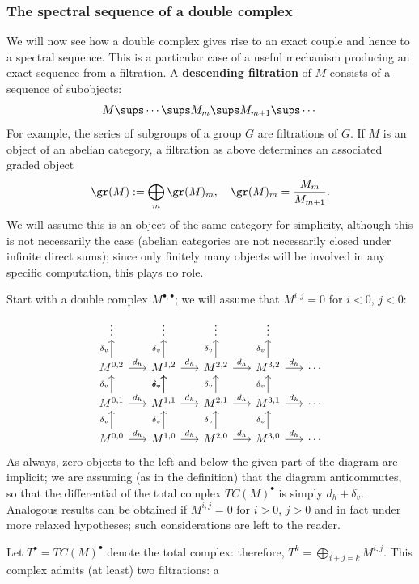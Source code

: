 \subsubsection{The spectral sequence of a double complex}
We will now see how a double complex gives rise to an exact couple and hence to a spectral sequence. This is a particular case of a useful mechanism producing an exact sequence from a filtration. A \textbf{descending filtration} of $M$ consists of a sequence of subobjects:
\[M\sups\cdots\sups M_m\sups M_{m+1}\sups\cdots\]
For example, the series of subgroups of a group $G$ are filtrations of $G$. If $M$ is an object of an abelian category, a filtration as above determines an associated graded object
\[\gr(M):=\bigoplus_m\gr(M)_m,\quad \gr(M)_m=\dfrac{M_m}{M_{m+1}}.\]
We will assume this is an object of the same category for simplicity, although this is not necessarily the case (abelian categories are not necessarily closed under
infinite direct sums); since only finitely many objects will be involved in any specific computation, this plays no role.\par
Start with a double complex $M^{\bullet,\bullet}$; we will assume that $M^{i,j}=0$ for $i<0$, $j<0$:
\[\begin{tikzcd}[column sep=1.6 em,row sep=1.6 em]
\vdots&\vdots&\vdots&\vdots&{}\\
M^{0,2}\ar[u,"\delta_v"]\ar[r,"d_h"]&M^{1,2}\ar[u,"\delta_v"]\ar[r,"d_h"]&M^{2,2}\ar[u,"\delta_v"]\ar[r,"d_h"]&M^{3,2}\ar[r,"d_h"]\ar[u,"\delta_v"]&\cdots\\
M^{0,1}\ar[r,"d_h"]\ar[u,"\delta_v"]&M^{1,1}\ar[u,"\delta_v"]\ar[r,"d_h"]\ar[u,"\delta_v"]&M^{2,1}\ar[u,"\delta_v"]\ar[r,"d_h"]&M^{3,1}\ar[u,"\delta_v"]\ar[r,"d_h"]&\cdots\\
M^{0,0}\ar[u,"\delta_v"]\ar[r,"d_h"]&M^{1,0}\ar[u,"\delta_v"]\ar[r,"d_h"]&M^{2,0}\ar[u,"\delta_v"]\ar[r,"d_h"]&M^{3,0}\ar[r,"d_h"]\ar[u,"\delta_v"]&\cdots
\end{tikzcd}\]
As always, zero-objects to the left and below the given part of the diagram are implicit; we are assuming (as in the definition) that the diagram anticommutes, so that 
the differential of the total complex $TC(M)^\bullet$ is simply $d_h+\delta_v$. Analogous results can be obtained if $M^{i,j}=0$ for $i>0$, $j>0$ and in fact under 
more relaxed hypotheses; such considerations are left to the reader.\par
Let $T^\bullet=TC(M)^\bullet$ denote the total complex: therefore, $T^k=\bigoplus_{i+j=k}M^{i,j}$. This complex admits (at least) two filtrations: a 
